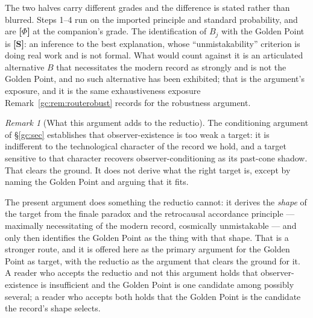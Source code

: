 \documentclass[11pt]{article}
\numberwithin{equation}{section}
\theoremstyle{plain}
\theoremstyle{definition}
\theoremstyle{remark}
\newtheorem{remark}[theorem]{Remark}
\begin{document}
The two halves carry different grades and the difference is stated
rather than blurred. Steps 1--4 run on the imported principle and
standard probability, and are \textbf{[$\Phi$]} at the companion's
grade. The identification of $B_j$ with the Golden Point is
\textbf{[S]}: an inference to the best explanation, whose
``unmistakability'' criterion is doing real work and is not formal. What
would count against it is an articulated alternative $B$ that
necessitates the modern record as strongly and is not the Golden Point,
and no such alternative has been exhibited; that is the argument's
exposure, and it is the same exhaustiveness exposure
Remark~\ref{gc:rem:routerobust} records for the robustness argument.

\begin{remark}[What this argument adds to the reductio]\label{ra:rem:spine}
The conditioning argument of \S\ref{gc:sec} establishes that
observer-existence is too weak a target: it is indifferent to the
technological character of the record we hold, and a target sensitive to
that character recovers observer-conditioning as its past-cone shadow.
That clears the ground. It does not derive what the right target is,
except by naming the Golden Point and arguing that it fits.

The present argument does something the reductio cannot: it derives the
\emph{shape} of the target from the finale paradox and the retrocausal
accordance principle --- maximally necessitating of the modern record,
cosmically unmistakable --- and only then identifies the Golden Point as
the thing with that shape. That is a stronger route, and it is offered
here as the primary argument for the Golden Point as target, with the
reductio as the argument that clears the ground for it. A reader who
accepts the reductio and not this argument holds that observer-existence
is insufficient and the Golden Point is one candidate among possibly
several; a reader who accepts both holds that the Golden Point is the
candidate the record's shape selects.
\end{remark}
\end{document}
